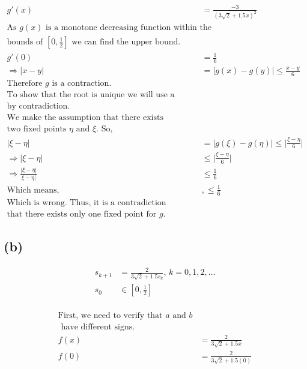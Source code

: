 \documentclass{article}
\begin{document}
\begin{align*}
    g'(x) &= \frac{-3}{(3\sqrt{2}+1.5x)^2}\\
    \text{As $g(x)$ is a monotone decreasing function within the}&\\
    \text{bounds of $\left[0, \frac{1}{2}\right]$ we can find the upper bound.}&\\
    g'(0)&= \frac{1}{6}\\
    \Rightarrow |x-y|&= |g(x)-g(y)| \le \frac{x-y}{6}\\
    \text{Therefore $g$ is a contraction.}&\\
    \text{To show that the root is unique we will use a proof}&\\
    \text{by contradiction.}&\\
    \text{We make the assumption that there exists}&\\
    \text{two fixed points $\eta$ and $\xi$. So,}&\\
    |\xi - \eta|&= |g(\xi)-g(\eta)|\le \bigg | \frac{\xi - \eta}{6}\bigg |\\
    \Rightarrow |\xi - \eta|& \le \bigg | \frac{\xi - \eta}{6}\bigg |\\
    \Rightarrow \frac{| \xi - \eta|}{\xi - \eta|}& \le \frac{1}{6}\\
    \text{Which means, }&, \le \frac{1}{6}\\
    \text{Which is wrong. Thus, it is a contradiction meaning}&\\
    \text{that there exists only one fixed point for $g$.}
\end{align*}

\vspace{10mm}
\subsection*{(b)}

\begin{align*}
     s_{k+1} &= \frac{2}{3\sqrt{2}+1.5s_k} \text{, }k=0,1,2,\dots\\
     s_0 &\in \left[0, \frac{1}{2} \right]\\
\end{align*}

\begin{align*}
    \text{First, we need to verify that $a$ and $b$}&\\
    \text{ have different signs.}&\\
     f(x) &= \frac{2}{3\sqrt{2}+1.5x}\\
     f(0) &= \frac{2}{3\sqrt{2}+1.5(0)}
\end{align*}
\end{document}
